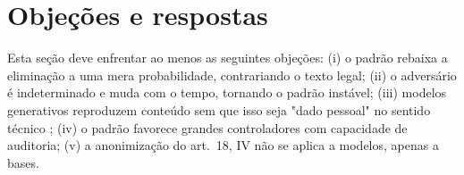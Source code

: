 \section{Objeções e respostas}


Esta seção deve enfrentar ao menos as seguintes objeções: (i) o padrão
rebaixa a eliminação a uma mera probabilidade, contrariando o texto legal;
(ii) o adversário é indeterminado e muda com o tempo, tornando o padrão
instável; (iii) modelos generativos reproduzem conteúdo sem que isso seja
"dado pessoal" no sentido técnico \parencite{cooper2024unlearning}; (iv) o
padrão favorece grandes controladores com capacidade de auditoria; (v) a
anonimização do art.~18, IV não se aplica a modelos, apenas a bases.

